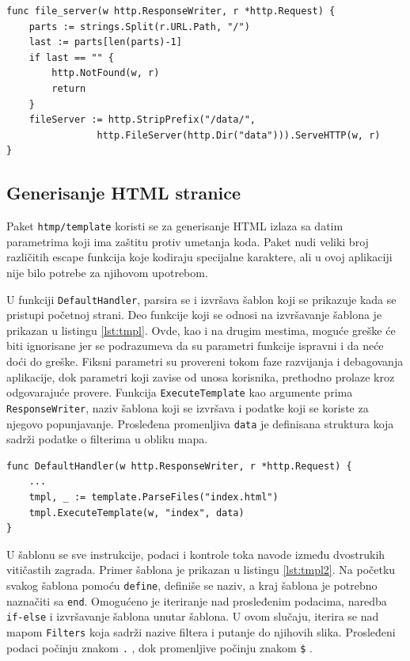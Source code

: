 \documentclass[12pt,oneside]{memoir}
\begin{document}
\begin{center}
\begin{lstlisting}[caption=Hendler za fajl sistem,label={lst:fileserver},  backgroundcolor=\color{background}]
func file_server(w http.ResponseWriter, r *http.Request) {
	parts := strings.Split(r.URL.Path, "/")
	last := parts[len(parts)-1]
	if last == "" {
		http.NotFound(w, r)
		return
	}
	fileServer := http.StripPrefix("/data/", 
				http.FileServer(http.Dir("data"))).ServeHTTP(w, r)
}
\end{lstlisting}
\end{center}

\subsection{Generisanje HTML stranice}

Paket \texttt{htmp/template} koristi se za generisanje HTML izlaza sa datim parametrima koji ima zaštitu protiv umetanja koda. Paket nudi veliki broj različitih escape funkcija koje kodiraju specijalne karaktere, ali u ovoj aplikaciji nije bilo potrebe za njihovom upotrebom. 

U funkciji \texttt{DefaultHandler}, parsira se i izvršava šablon koji se prikazuje kada se pristupi početnoj strani. Deo funkcije koji se odnosi na izvršavanje šablona je prikazan u listingu \ref{lst:tmpl}. Ovde, kao i na drugim mestima, moguće greške će biti ignorisane jer se podrazumeva da su parametri funkcije ispravni i da neće doći do greške. Fiksni parametri su provereni tokom faze razvijanja i debagovanja aplikacije, dok parametri koji zavise od unosa korisnika, prethodno prolaze kroz odgovarajuće provere. Funkcija \texttt{ExecuteTemplate} kao argumente prima \texttt{ResponseWriter}, naziv šablona koji se izvršava i podatke koji se koriste za njegovo popunjavanje. Prosleđena promenljiva \texttt{data} je definisana struktura koja sadrži podatke o filterima u obliku mapa.

\begin{center}
\begin{lstlisting}[caption=Izvršavanje HTML šablona,label={lst:tmpl},  backgroundcolor=\color{background}]
func DefaultHandler(w http.ResponseWriter, r *http.Request) {
	...
	tmpl, _ := template.ParseFiles("index.html")
	tmpl.ExecuteTemplate(w, "index", data)
}
\end{lstlisting}
\end{center}

U šablonu se sve instrukcije, podaci i kontrole toka navode između dvostrukih vitičastih zagrada. Primer šablona je prikazan u listingu \ref{lst:tmpl2}. Na početku svakog šablona pomoću \texttt{define}, definiše se naziv, a kraj šablona je potrebno naznačiti sa \texttt{end}. Omogućeno je iteriranje nad prosleđenim podacima, naredba \texttt{if-else} i izvršavanje šablona unutar šablona. U ovom slučaju, iterira se nad mapom \texttt{Filters} koja sadrži nazive filtera i putanje do njihovih slika. Prosleđeni podaci počinju znakom \texttt{.} , dok promenljive počinju znakom \texttt{\$} \cite{template}.
\end{document}

